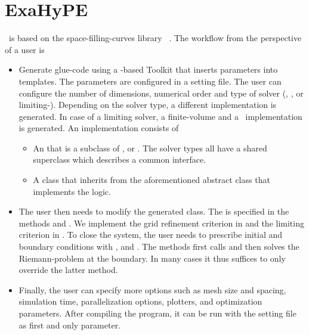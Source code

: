 \section{ExaHyPE}
\exahype\ is based on the space-filling-curves library \peano~\cite{weinzierl2011}.
The workflow from the perspective of a user is
\begin{itemize}
\item Generate glue-code using a -based Toolkit that inserts parameters into templates.
  The parameters are configured in a setting file.
  The user can configure the number of dimensions, numerical order and type of solver (\aderdg{}, \muscl, or limiting-\aderdg).
  Depending on the solver type, a different implementation is generated.
  In case of a limiting solver, a finite-volume and a \dg\ implementation is generated.
  An implementation consists of
  \begin{itemize}
  \item An  that is a subclass of ,  or .
    The solver types all have a shared superclass  which describes a common interface.
  \item A class that inherits from the aforementioned abstract class that implements the \pde{} logic.
  \end{itemize}
  
\item The user then needs to modify the generated  class.
  The \pde{} is specified in the methods  and .
  We implement the grid refinement criterion in  and the limiting criterion in .
  To close the system, the user needs to prescribe initial and boundary conditions with ,  and .
  The methods  first calls  and then solves the Riemann-problem at the boundary.
  In many cases it thus suffices to only override the latter method.
\item Finally, the user can specify more options such as mesh size and spacing, simulation time, parallelization options, plotters, and optimization parameters.
 After compiling the program, it can be run with the setting file as first and only parameter.
\end{itemize}

